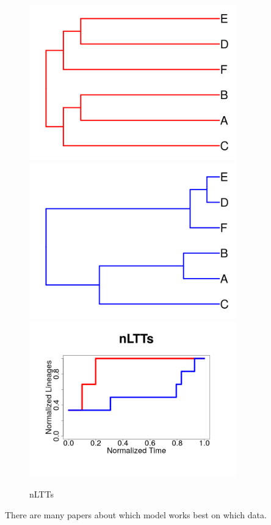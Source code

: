 \begin{figure}[H]
  \includegraphics[width=0.8\textwidth]{true_tree.png}
  \includegraphics[width=0.8\textwidth]{twin_tree.png}
  \includegraphics[width=0.8\textwidth]{nltt.png}
  \caption{
    nLTTs
  }
  \label{fig:densitree_again}
\end{figure}






There are many papers about which model works best on which data.
 




